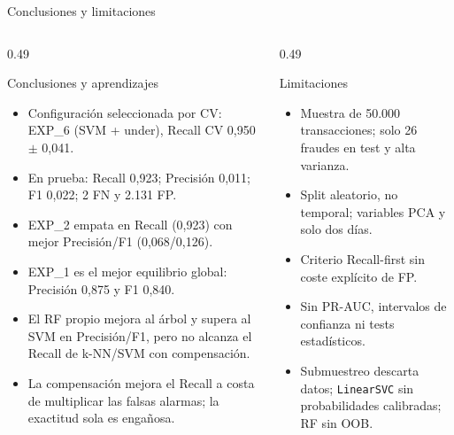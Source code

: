 \documentclass[aspectratio=169,11pt]{beamer}
\begin{document}
\begin{frame}{Conclusiones y limitaciones}
  \begin{columns}[T]
    \begin{column}{0.49\textwidth}
      \begin{block}{Conclusiones y aprendizajes}
        \scriptsize
        \begin{itemize}
          \item Configuración seleccionada por CV: EXP\_6 (SVM + under),
                Recall CV 0,950 \(\pm\) 0,041.
          \item En prueba: Recall 0,923; Precisión 0,011; F1 0,022;
                2 FN y 2.131 FP.
          \item EXP\_2 empata en Recall (0,923) con mejor Precisión/F1
                (0,068/0,126).
          \item EXP\_1 es el mejor equilibrio global: Precisión 0,875
                y F1 0,840.
          \item El RF propio mejora al árbol y supera al SVM en
                Precisión/F1, pero no alcanza el Recall de k-NN/SVM
                con compensación.
          \item La compensación mejora el Recall a costa de multiplicar
                las falsas alarmas; la exactitud sola es engañosa.
        \end{itemize}
      \end{block}
    \end{column}
    \begin{column}{0.49\textwidth}
      \begin{block}{Limitaciones}
        \scriptsize
        \begin{itemize}
          \item Muestra de 50.000 transacciones; solo 26 fraudes en test
                y alta varianza.
          \item Split aleatorio, no temporal; variables PCA y solo dos días.
          \item Criterio Recall-first sin coste explícito de FP.
          \item Sin PR-AUC, intervalos de confianza ni tests estadísticos.
          \item Submuestreo descarta datos; \texttt{LinearSVC} sin
                probabilidades calibradas; RF sin OOB.
        \end{itemize}

\end{block}
\end{column}
\end{columns}
\end{frame}
\end{document}
